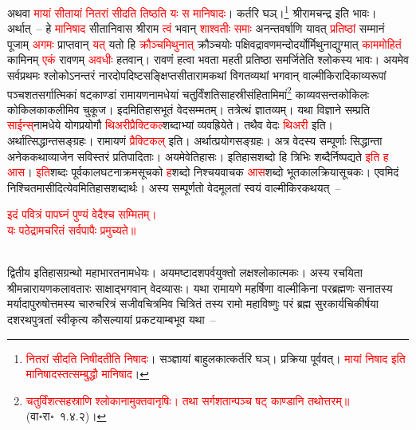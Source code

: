 \begin{sloppypar}
अथवा \textcolor{red}{मायां सीतायां नितरां सीदति तिष्ठति यः स मानिषादः}। कर्तरि घञ्।\footnote{\textcolor{red}{नितरां सीदति निषीदतीति निषादः}। सञ्ज्ञायां बाहुलकात्कर्तरि घञ्। प्रक्रिया पूर्ववत्। \textcolor{red}{मायां निषाद इति मानिषादस्तत्सम्बुद्धौ मानिषाद}।} श्रीरामचन्द्र इति भावः। अर्थात्~– हे \textcolor{red}{मानिषाद} सीतानिवास श्रीराम \textcolor{red}{त्वं} भवान् \textcolor{red}{शाश्वतीः समाः} अनन्त\-वर्षाणि यावत् \textcolor{red}{प्रतिष्ठां} सम्मानं पूजाम् \textcolor{red}{अगमः} प्राप्तवान् \textcolor{red}{यत्} यतो हि \textcolor{red}{क्रौञ्च\-मिथुनात्} क्रौञ्चयोः पक्षिवद्रावण\-मन्दोदर्यो\-र्मिथुनाद्युग्मात् \textcolor{red}{काम\-मोहितं} कामिनम् \textcolor{red}{एकं} रावणम् \textcolor{red}{अवधीः} हतवान्। रावणं हत्वा भवता महती प्रतिष्ठा समर्जितेति श्लोकस्य भावः। अयमेव सर्व\-प्रथमः श्लोकोऽनन्तरं नारदोपदिष्ट\-सङ्क्षिप्त\-सीताराम\-कथां विगतव्यथां भगवान् वाल्मीकिरादि\-काव्यरूपां पञ्चशतसर्गात्मिकां षट्काण्डां रामायण\-नामधेयां चतुर्विंशति\-साहस्री\-संहितामिमां\footnote{\textcolor{red}{चतुर्विंशत्सहस्राणि श्लोकानामुक्तवानृषिः। तथा सर्गशतान्पञ्च षट् काण्डानि तथोत्तरम्॥} (वा॰रा॰~१.४.२)।} काव्यवसन्त\-कोकिलः कोकिल\-काकलीमिव चुकूज। इदमितिहास\-भूतं वेद\-सम्मतम्। तत्रेत्थं ज्ञातव्यम्। यथा विज्ञाने सम्प्रति \textcolor{red}{साईन्स्‌}\-नामधेये योग\-प्रयोगौ \textcolor{red}{थिअरी\-प्रैक्टिकल्}\-शब्दाभ्यां व्यवह्रियेते। तथैव वेदः \textcolor{red}{थिअरी} इति। अर्थात्सिद्धान्त\-सङ्ग्रहः। रामायणं \textcolor{red}{प्रैक्टिकल्} इति। अर्थात्प्रयोग\-सङ्ग्रहः। अत्र वेदस्य सम्पूर्णाः सिद्धान्ता अनेक\-कथा\-व्याजेन सविस्तरं प्रतिपादिताः। अयमेवेतिहासः। इतिहास\-शब्दो हि त्रिभिः शब्दैर्निष्पद्यते \textcolor{red}{इति ह आस}। \textcolor{red}{इति}\-शब्दः पूर्वकाल\-घटना\-क्रम\-सूचको \textcolor{red}{ह}\-शब्दो निश्चयवाचक \textcolor{red}{आस}\-शब्दो भूतकाल\-क्रिया\-सूचकः। एवमिदं निश्चितमासीदित्येवमितिहास\-शब्दार्थः। अस्य सम्पूर्णतो वेदमूलतां स्वयं वाल्मीकिरकथयत्~–\end{sloppypar}
\centering\textcolor{red}{इदं पवित्रं पापघ्नं पुण्यं वेदैश्च सम्मितम्।\nopagebreak\\
यः पठेद्रामचरितं सर्वपापैः प्रमुच्यते॥}\nopagebreak\\
\\
\begin{sloppypar}\justifying\noindent\hspace{10mm} द्वितीय इतिहास\-ग्रन्थो महाभारत\-नामधेयः। अयमष्टादश\-पर्वयुक्तो लक्षश्लोकात्मकः। अस्य रचयिता श्रीमन्नारायण\-कलावतारः साक्षाद्भगवान् वेदव्यासः। यथा रामायणे महर्षिणा वाल्मीकिना परब्रह्मणः सनातस्य मर्यादा\-पुरुषोत्तमस्य चारु\-चरित्रं सजीव\-चित्रमिव चित्रितं तस्य रामो महाविष्णुः परं ब्रह्म सुरकार्य\-चिकीर्षया दशरथ\-पुत्रतां स्वीकृत्य कौसल्यायां प्रकटयाम्बभूव यथा~–\end{sloppypar}
